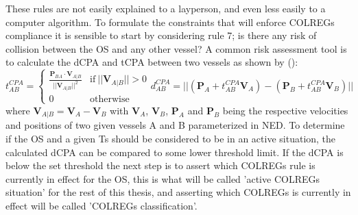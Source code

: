 These rules are not easily explained to a layperson, and even less easily to a computer algorithm. To formulate the constraints that will
enforce \gls{COLREGs} compliance it is sensible to start by considering rule 7; is there any risk of collision between the \gls{OS}
and any other vessel? A common risk assessment tool is to calculate the \gls{dCPA} and \gls{tCPA} between two vessels as shown by (\cite{Kufoalor2018}):
\begin{subequations}    \label{eq:tCPAdCPA}
    \begin{equation}
        t_{AB}^{CPA} = 
        \begin{cases}
          \frac{\textbf{P}_{BA} \cdot \textbf{V}_{A|B}}{||\textbf{V}_{A|B}||^2} & \text{if}\ ||\textbf{V}_{A|B}|| > 0 \\
          0 & \text{otherwise}
        \end{cases}
    \end{equation}
    \begin{equation}
        d_{AB}^{CPA} = ||(\textbf{P}_A + t_{AB}^{CPA} \textbf{V}_A) - (\textbf{P}_B + t_{AB}^{CPA} \textbf{V}_B)||
    \end{equation}
\end{subequations}
where $\textbf{V}_{A|B} = \textbf{V}_A - \textbf{V}_B$ with $\textbf{V}_A$, $\textbf{V}_B$, $\textbf{P}_A$ and $\textbf{P}_B$ being the respective
velocities and positions of two given vessels A and B parameterized in NED. To determine if the \gls{OS} and a given \gls{Ts} should be
considered to be in an active situation, the calculated \gls{dCPA} can be compared to some lower threshold limit. If the \gls{dCPA} is below the set threshold
the next step is to assert which \gls{COLREGs} rule is currently in effect for the \gls{OS}, this is what will be called 'active \gls{COLREGs}
situation' for the rest of this thesis, and asserting which \gls{COLREGs} is currently in effect will be called 'COLREGs classification'.

